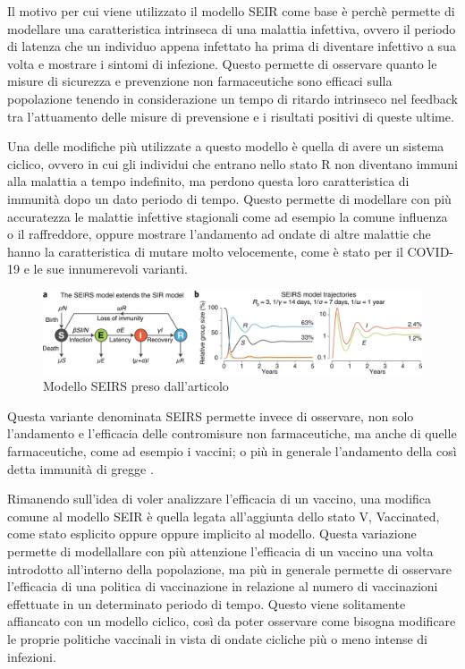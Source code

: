 Il motivo per cui viene utilizzato il modello SEIR come base è perchè permette di 
modellare una caratteristica intrinseca di una malattia infettiva, ovvero 
il periodo di latenza che un individuo appena infettato ha prima di diventare 
infettivo a sua volta e mostrare i sintomi di infezione. Questo permette 
di osservare quanto le misure di sicurezza e prevenzione non farmaceutiche 
sono efficaci sulla popolazione tenendo in considerazione 
un tempo di ritardo intrinseco nel feedback tra l'attuamento delle 
misure di prevensione e i risultati positivi di queste ultime.

Una delle modifiche più utilizzate a questo modello è quella di avere un sistema 
ciclico, ovvero in cui gli individui che entrano nello stato R non diventano immuni 
alla malattia a tempo indefinito, ma perdono questa loro caratteristica di immunità
dopo un dato periodo di tempo. Questo permette di modellare con più accuratezza le malattie
infettive stagionali come ad esempio la comune influenza o il raffreddore, oppure 
mostrare l'andamento ad ondate di altre malattie che hanno la caratteristica di 
mutare molto velocemente, come è stato per il COVID-19 e le sue innumerevoli varianti.

\newpage

\begin{figure}[h]
    \includegraphics[width=\linewidth]{img/41592_2020_856_Fig1_HTML.png}
    \caption{Modello SEIRS preso dall'articolo \cite{Bjornstad2020}}
    \label{fig:SEIRS_model}
\end{figure}

Questa variante denominata SEIRS permette invece di osservare, non solo l'andamento e 
l'efficacia delle contromisure non farmaceutiche, ma anche di quelle
farmaceutiche, come ad esempio i vaccini; o più in generale l'andamento
della così detta immunità di gregge \cite{Bjornstad2020}. 

Rimanendo sull'idea di voler analizzare l'efficacia di un vaccino, una
modifica comune al modello SEIR è quella legata all'aggiunta dello stato V,
Vaccinated, come stato esplicito oppure oppure implicito al modello. Questa 
variazione permette di modellallare con più attenzione l'efficacia di un 
vaccino una volta introdotto all'interno della popolazione, 
ma più in generale permette di osservare l'efficacia di una politica di vaccinazione 
in relazione al numero di vaccinazioni effettuate in un determinato periodo di tempo.
Questo viene solitamente affiancato con un modello ciclico, così da poter
osservare come bisogna modificare le proprie politiche vaccinali in vista
di ondate cicliche più o meno intense di infezioni.


